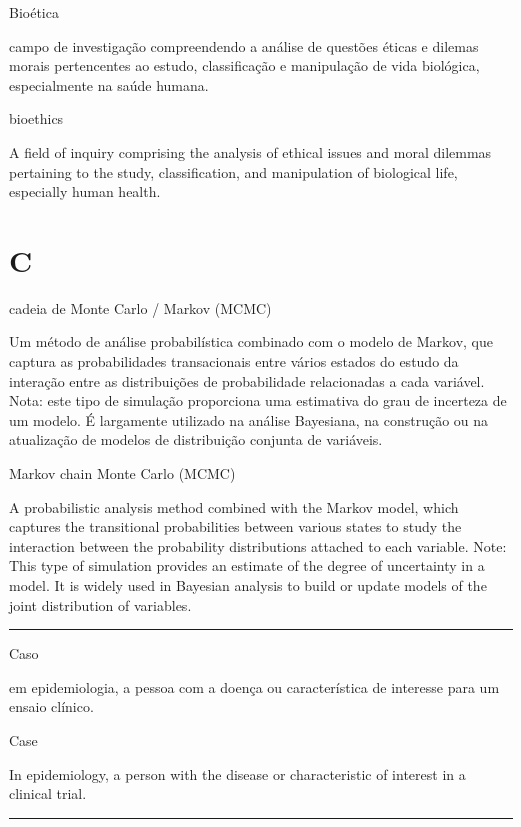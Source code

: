 \documentclass[
  openany]{book}
\begin{document}
Bioética

campo de investigação compreendendo a análise de questões éticas e dilemas morais pertencentes ao estudo, classificação e manipulação de vida biológica, especialmente na saúde humana.

bioethics

A field of inquiry comprising the analysis of ethical issues and moral dilemmas pertaining to the study, classification, and manipulation of biological life, especially human health.

\hypertarget{c}{%
\chapter*{C}\label{c}}

cadeia de Monte Carlo / Markov (MCMC)

Um método de análise probabilística combinado com o modelo de Markov, que captura as probabilidades transacionais entre vários estados do estudo da interação entre as distribuições de probabilidade relacionadas a cada variável. Nota: este tipo de simulação proporciona uma estimativa do grau de incerteza de um modelo. É largamente utilizado na análise Bayesiana, na construção ou na atualização de modelos de distribuição conjunta de variáveis.

Markov chain Monte Carlo (MCMC)

A probabilistic analysis method combined with the Markov model, which captures the transitional probabilities between various states to study the interaction between the probability distributions attached to each variable. Note: This type of simulation provides an estimate of the degree of uncertainty in a model. It is widely used in Bayesian analysis to build or update models of the joint distribution of variables.

\begin{center}\rule{0.5\linewidth}{0.5pt}\end{center}

Caso

em epidemiologia, a pessoa com a doença ou característica de interesse para um ensaio clínico.

Case

In epidemiology, a person with the disease or characteristic of interest in a clinical trial.

\begin{center}\rule{0.5\linewidth}{0.5pt}\end{center}
\end{document}
